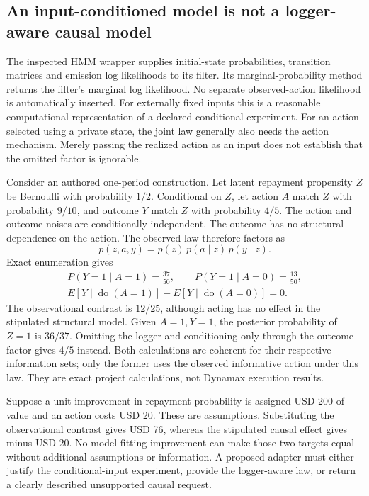 \subsection{An input-conditioned model is not a logger-aware causal model}
\label{exec19:dynamax-logger}

The inspected HMM wrapper supplies initial-state probabilities, transition
matrices and emission log likelihoods to its filter. Its marginal-probability
method returns the filter's marginal log likelihood. No separate observed-action
likelihood is automatically inserted. For externally fixed inputs this is a
reasonable computational representation of a declared conditional experiment.
For an action selected using a private state, the joint law generally also needs
the action mechanism. Merely passing the realized action as an input does not
establish that the omitted factor is ignorable.~\citep{exec19_dynamax_source}

Consider an authored one-period construction. Let latent repayment propensity
$Z$ be Bernoulli with probability $1/2$. Conditional on $Z$, let action $A$
match $Z$ with probability $9/10$, and outcome $Y$ match $Z$ with probability
$4/5$. The action and outcome noises are conditionally independent. The outcome
has no structural dependence on the action. The observed law therefore factors as
\begin{equation}
 p(z,a,y)=p(z)\,p(a\mid z)\,p(y\mid z).
 \label{exec19:dynamax-law}
\end{equation}
Exact enumeration gives
\begin{equation}
 \begin{gathered}
 P(Y=1\mid A=1)=\frac{37}{50},\qquad
 P(Y=1\mid A=0)=\frac{13}{50},\\
 E[Y\mid\operatorname{do}(A=1)]-E[Y\mid\operatorname{do}(A=0)]=0.
 \end{gathered}
 \label{exec19:dynamax-contrast}
\end{equation}
The observational contrast is $12/25$, although acting has no effect in the
stipulated structural model. Given $A=1,Y=1$, the posterior probability of
$Z=1$ is $36/37$. Omitting the logger and conditioning only through the outcome
factor gives $4/5$ instead. Both calculations are coherent for their respective
information sets; only the former uses the observed informative action under
this law. They are exact project calculations, not Dynamax execution results.
\citep{exec19_dynamax_reference}

Suppose a unit improvement in repayment probability is assigned USD 200 of
value and an action costs USD 20. These are assumptions. Substituting the
observational contrast gives USD 76, whereas the stipulated causal effect gives
minus USD 20. No model-fitting improvement can make those two targets equal
without additional assumptions or information. A proposed adapter must either
justify the conditional-input experiment, provide the logger-aware law, or
return a clearly described unsupported causal request.~\citep{exec19_dynamax_reference}

